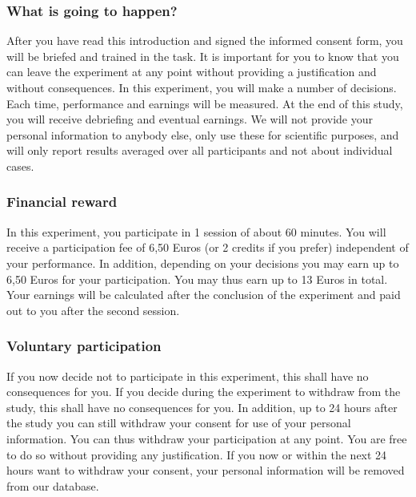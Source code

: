 \documentclass[
  man]{apa6}
\begin{document}
\hypertarget{what-is-going-to-happen}{%
\subsubsection{What is going to happen?}\label{what-is-going-to-happen}}

After you have read this introduction and signed the informed consent form, you will be briefed and trained in the task. It is important for you to know that you can leave the experiment at any point without providing a justification and without consequences. In this experiment, you will make a number of decisions. Each time, performance and earnings will be measured. At the end of this study, you will receive debriefing and eventual earnings. We will not provide your personal information to anybody else, only use these for scientific purposes, and will only report results averaged over all participants and not about individual cases.

\hypertarget{financial-reward}{%
\subsubsection{Financial reward}\label{financial-reward}}

In this experiment, you participate in 1 session of about 60 minutes. You will receive a participation fee of 6,50 Euros (or 2 credits if you prefer) independent of your performance. In addition, depending on your decisions you may earn up to 6,50 Euros for your participation. You may thus earn up to 13 Euros in total. Your earnings will be calculated after the conclusion of the experiment and paid out to you after the second session.

\hypertarget{voluntary-participation}{%
\subsubsection{Voluntary participation}\label{voluntary-participation}}

If you now decide not to participate in this experiment, this shall have no consequences for you. If you decide during the experiment to withdraw from the study, this shall have no consequences for you. In addition, up to 24 hours after the study you can still withdraw your consent for use of your personal information. You can thus withdraw your participation at any point. You are free to do so without providing any justification. If you now or within the next 24 hours want to withdraw your consent, your personal information will be removed from our database.
\end{document}
